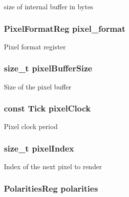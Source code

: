 \label{classHDLcd_a43f658311547cdd328f725c29f629d43}
size of internal buffer in bytes \hypertarget{classHDLcd_aadff074534cd557dcaa412b3a5860be5}{
\subsubsection[{pixel\_\-format}]{\setlength{\rightskip}{0pt plus 5cm}PixelFormatReg {\bf pixel\_\-format}}}
\label{classHDLcd_aadff074534cd557dcaa412b3a5860be5}
Pixel format register \hypertarget{classHDLcd_a77d3768993df37b5ded2ce8a0567db9e}{
\subsubsection[{pixelBufferSize}]{\setlength{\rightskip}{0pt plus 5cm}size\_\-t {\bf pixelBufferSize}}}
\label{classHDLcd_a77d3768993df37b5ded2ce8a0567db9e}
Size of the pixel buffer \hypertarget{classHDLcd_a1482911218ac61eabec3de2d904b8274}{
\subsubsection[{pixelClock}]{\setlength{\rightskip}{0pt plus 5cm}const {\bf Tick} {\bf pixelClock}}}
\label{classHDLcd_a1482911218ac61eabec3de2d904b8274}
Pixel clock period \hypertarget{classHDLcd_a9b265584471f3f05939bd3891884ba23}{
\subsubsection[{pixelIndex}]{\setlength{\rightskip}{0pt plus 5cm}size\_\-t {\bf pixelIndex}}}
\label{classHDLcd_a9b265584471f3f05939bd3891884ba23}
Index of the next pixel to render \hypertarget{classHDLcd_a1b4fe6c75f98c50fad2eebc75f143dd2}{
\subsubsection[{polarities}]{\setlength{\rightskip}{0pt plus 5cm}PolaritiesReg {\bf polarities}}}
